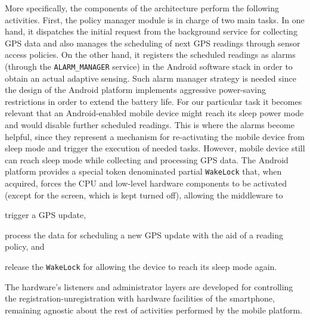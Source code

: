 \documentclass[ENG,PhD]{cinvestav}
\begin{document}
More specifically, the components of the architecture perform the following activities.
First, the policy manager module is in charge of two main tasks.
In one hand, it dispatches the initial request from the background service for collecting GPS data and also manages the scheduling of next GPS readings through sensor access policies.
On the other hand, it registers the scheduled readings as alarms (through the \verb|ALARM_MANAGER| service) in the Android software stack in order to obtain an actual adaptive sensing.
Such alarm manager strategy is needed since the design of the Android platform implements aggressive power-saving restrictions in order to extend the battery life.
For our particular task it becomes relevant that an Android-enabled mobile device might reach its sleep power mode and would disable further scheduled readings.
This is where the alarms become helpful, since they represent a mechanism for re-activating the mobile device from sleep mode and trigger the execution of needed tasks.
However, mobile device still can reach sleep mode while collecting and processing GPS data.
The Android platform provides a special token denominated partial \verb|WakeLock| that, when acquired, forces the CPU and low-level hardware components to be activated (except for the screen, which is kept turned off), allowing the middleware to
\begin{listahorizontal}
  \item trigger a GPS update,
  \item process the data for scheduling a new GPS update with the aid of a reading policy, and
  \item release the \verb|WakeLock| for allowing the device to reach its sleep mode again.
\end{listahorizontal}

The hardware's listeners and administrator layers are developed for controlling the registration-unregistration with hardware facilities of the smartphone, remaining agnostic about the rest of activities performed by the mobile platform.

\end{document}
